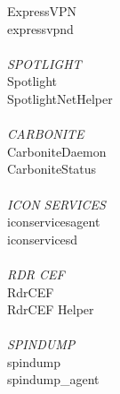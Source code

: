 ExpressVPN\\
expressvpnd\\
\\
\textit{SPOTLIGHT}\\
Spotlight\\
SpotlightNetHelper\\
\\
\textit{CARBONITE}\\
CarboniteDaemon\\
CarboniteStatus\\
\\
\textit{ICON SERVICES}\\
iconservicesagent\\
iconservicesd\\
\\
\textit{RDR CEF}\\
RdrCEF\\
RdrCEF Helper\\
\\
\textit{SPINDUMP}\\
spindump\\
spindump\_agent\\

